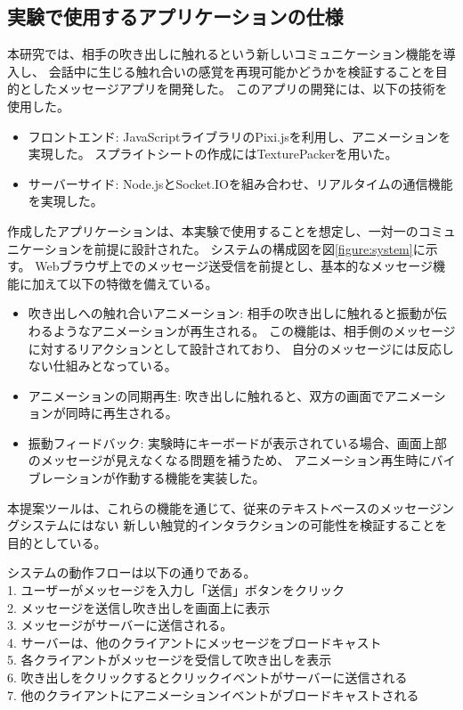 \documentclass[11pt,a4paper]{ltjsreport}
\begin{document}
\subsection{実験で使用するアプリケーションの仕様}
本研究では、相手の吹き出しに触れるという新しいコミュニケーション機能を導入し、
会話中に生じる触れ合いの感覚を再現可能かどうかを検証することを目的としたメッセージアプリを開発した。
このアプリの開発には、以下の技術を使用した。

\begin{itemize}
    \item フロントエンド: JavaScriptライブラリのPixi.jsを利用し、アニメーションを実現した。
    スプライトシートの作成にはTexturePackerを用いた。
    \item サーバーサイド: Node.jsとSocket.IOを組み合わせ、リアルタイムの通信機能を実現した。
\end{itemize}

作成したアプリケーションは、本実験で使用することを想定し、一対一のコミュニケーションを前提に設計された。
システムの構成図を図\ref{figure:system}に示す。
Webブラウザ上でのメッセージ送受信を前提とし、基本的なメッセージ機能に加えて以下の特徴を備えている。

\begin{itemize}
    \item 吹き出しへの触れ合いアニメーション:
    相手の吹き出しに触れると振動が伝わるようなアニメーションが再生される。
    この機能は、相手側のメッセージに対するリアクションとして設計されており、
    自分のメッセージには反応しない仕組みとなっている。
    \item アニメーションの同期再生:
    吹き出しに触れると、双方の画面でアニメーションが同時に再生される。
    \item 振動フィードバック:
    実験時にキーボードが表示されている場合、画面上部のメッセージが見えなくなる問題を補うため、
    アニメーション再生時にバイブレーションが作動する機能を実装した。
\end{itemize}

本提案ツールは、これらの機能を通じて、従来のテキストベースのメッセージングシステムにはない
新しい触覚的インタラクションの可能性を検証することを目的としている。

システムの動作フローは以下の通りである。\\
1. ユーザーがメッセージを入力し「送信」ボタンをクリック\\
2. メッセージを送信し吹き出しを画面上に表示\\
3. メッセージがサーバーに送信される。\\
4. サーバーは、他のクライアントにメッセージをブロードキャスト\\
5. 各クライアントがメッセージを受信して吹き出しを表示\\
6. 吹き出しをクリックするとクリックイベントがサーバーに送信される\\
7. 他のクライアントにアニメーションイベントがブロードキャストされる
\end{document}
